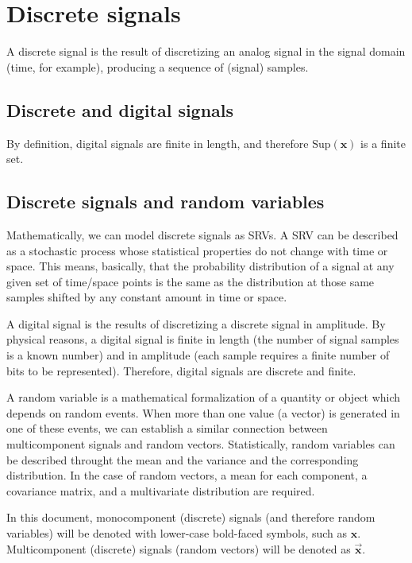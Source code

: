 \chapter{Discrete signals}

A discrete signal is the result of discretizing an analog signal in
the signal domain (time, for example), producing a sequence of
(signal) samples.

\section{Discrete and digital signals}

By definition, digital signals are finite in length, and therefore
$\text{Sup}(\mathbf{x})$ is a finite set.

\section{Discrete signals and random variables}

Mathematically, we can model discrete signals as \glspl{SRV}. A
\gls{SRV} can be described as a stochastic process whose statistical
properties do not change with time or space. This means, basically,
that the probability distribution of a signal at any given set of
time/space points is the same as the distribution at those same
samples shifted by any constant amount in time or space.


A digital signal is the results of discretizing a discrete signal in
amplitude. By physical reasons, a digital signal is finite in length
(the number of signal samples is a known number) and in amplitude
(each sample requires a finite number of bits to be
represented). Therefore, digital signals are discrete and finite.

A random variable is a mathematical formalization of a quantity or
object which depends on random events. When more than one value (a
vector) is generated in one of these events, we can establish a
similar connection between multicomponent signals and random
vectors. Statistically, random variables can be described throught the
mean and the variance and the corresponding distribution. In the case
of random vectors, a mean for each component, a covariance matrix, and
a multivariate distribution are required.

In this document, monocomponent (discrete) signals (and therefore
random variables) will be denoted with lower-case bold-faced symbols,
such as $\mathbf{x}$. Multicomponent (discrete) signals (random
vectors) will be denoted as $\overrightarrow{\mathbf{x}}$.

